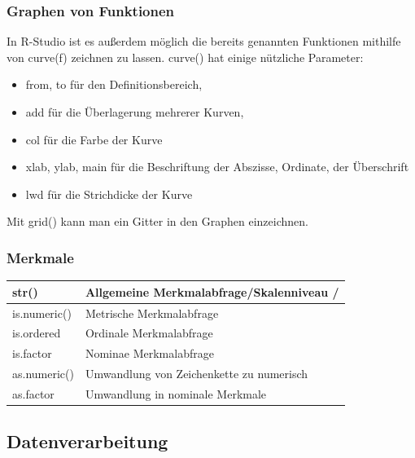 \documentclass[a4paper,10pt]{scrartcl}
\begin{document}
\subsubsection{Graphen von Funktionen}
In R-Studio ist es außerdem möglich die bereits genannten Funktionen mithilfe von curve(f) zeichnen zu lassen. curve() hat einige nützliche Parameter:
\begin{itemize}
    \item from, to für den Definitionsbereich,
    \item add für die Überlagerung mehrerer Kurven,
    \item col für die Farbe der Kurve
    \item xlab, ylab, main für die Beschriftung der Abszisse, Ordinate, der Überschrift
    \item lwd für die Strichdicke der Kurve
\end{itemize}
Mit grid() kann man ein Gitter in den Graphen einzeichnen.
\subsubsection{Merkmale}
\begin{table}[h]
    \begin{tabular}{|l|l|}\hline
str()&Allgemeine Merkmalabfrage/Skalenniveau /\\\hline
is.numeric()&Metrische Merkmalabfrage\\\hline
is.ordered&Ordinale Merkmalabfrage\\\hline
is.factor&Nominae Merkmalabfrage\\\hline
as.numeric()&Umwandlung von Zeichenkette zu numerisch\\\hline
as.factor&Umwandlung in nominale Merkmale\\\hline
\end{tabular}
    \label{tab:my_label}
\end{table}
\subsection{Datenverarbeitung}
\end{document}
